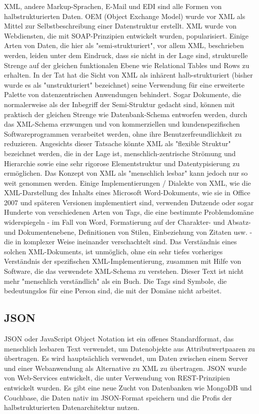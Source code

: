 XML, andere Markup-Sprachen, E-Mail und EDI sind alle Formen von halbstrukturierten Daten. OEM (Object Exchange Model) wurde vor XML als Mittel zur Selbstbeschreibung einer Datenstruktur erstellt. XML wurde von Webdiensten, die mit SOAP-Prinzipien entwickelt wurden, popularisiert.
Einige Arten von Daten, die hier als "semi-strukturiert", vor allem XML, beschrieben werden, leiden unter dem Eindruck, dass sie nicht in der Lage sind, strukturelle Strenge auf der gleichen funktionalen Ebene wie Relational Tables und Rows zu erhalten. In der Tat hat die Sicht von XML als inhärent halb-strukturiert (bisher wurde es als "unstrukturiert" bezeichnet) seine Verwendung für eine erweiterte Palette von datenzentrischen Anwendungen behindert. Sogar Dokumente, die normalerweise als der Inbegriff der Semi-Struktur gedacht sind, können mit praktisch der gleichen Strenge wie Datenbank-Schema entworfen werden, durch das XML-Schema erzwungen und von kommerziellen und kundenspezifischen Softwareprogrammen verarbeitet werden, ohne ihre Benutzerfreundlichkeit zu reduzieren. \cite{boneman2007}
Angesichts dieser Tatsache könnte XML als "flexible Struktur" bezeichnet werden, die in der Lage ist, menschlich-zentrische Strömung und Hierarchie sowie eine sehr rigorose Elementstruktur und Datentypisierung zu ermöglichen.
Das Konzept von XML als "menschlich lesbar" kann jedoch nur so weit genommen werden. Einige Implementierungen / Dialekte von XML, wie die XML-Darstellung des Inhalts eines Microsoft Word-Dokuments, wie sie in Office 2007 und späteren Versionen implementiert sind, verwenden Dutzende oder sogar Hunderte von verschiedenen Arten von Tags, die eine bestimmte Problemdomäne widerspiegeln - im Fall von Word, Formatierung auf der Charakter- und Absatz- und Dokumentenebene, Definitionen von Stilen, Einbeziehung von Zitaten usw. - die in komplexer Weise ineinander verschachtelt sind. Das Verständnis eines solchen XML-Dokuments, ist unmöglich, ohne ein sehr tiefes vorheriges Verständnis der spezifischen XML-Implementierung, zusammen mit Hilfe von Software, die das verwendete XML-Schema zu verstehen. Dieser Text ist nicht mehr "menschlich verständlich" als ein Buch. Die Tags sind Symbole, die bedeutungslos für eine Person sind, die mit der Domäne nicht arbeitet. \cite{lore}


\subsection{JSON}

JSON oder JavaScript Object Notation ist ein offenes Standardformat, das menschlich lesbaren Text verwendet, um Datenobjekte aus Attributwertpaaren zu übertragen. Es wird hauptsächlich verwendet, um Daten zwischen einem Server und einer Webanwendung als Alternative zu XML zu übertragen. JSON wurde von Web-Services entwickelt, die unter Verwendung von REST-Prinzipien entwickelt wurden.
Es gibt eine neue Zucht von Datenbanken wie MongoDB und Couchbase, die Daten nativ im JSON-Format speichern und die Profis der halbstrukturierten Datenarchitektur nutzen. \cite{buneman2010}

